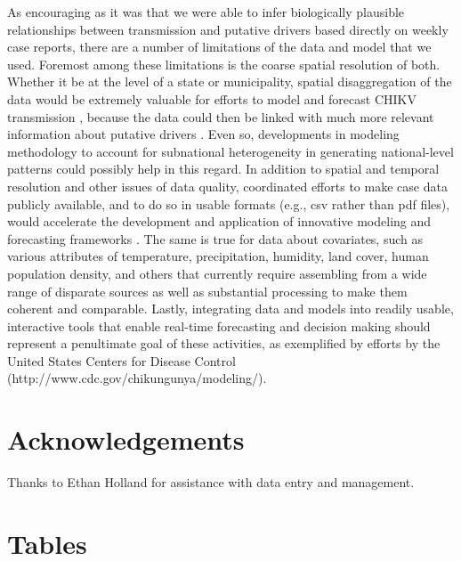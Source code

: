 \documentclass[11pt]{article}
\begin{document}
As encouraging as it was that we were able to infer biologically plausible relationships between transmission and putative drivers based directly on weekly case reports, there are a number of limitations of the data and model that we used. Foremost among these limitations is the coarse spatial resolution of both. Whether it be at the level of a state or municipality, spatial disaggregation of the data would be extremely valuable for efforts to model and forecast CHIKV transmission \cite{Perkins2013,Mills2014}, because the data could then be linked with much more relevant information about putative drivers \cite{Johansson2009}. Even so, developments in modeling methodology to account for subnational heterogeneity in generating national-level patterns could possibly help in this regard. In addition to spatial and temporal resolution and other issues of data quality, coordinated efforts to make case data publicly available, and to do so in usable formats (e.g., csv rather than pdf files), would accelerate the development and application of innovative modeling and forecasting frameworks \cite{Panhuis2013}. The same is true for data about covariates, such as various attributes of temperature, precipitation, humidity, land cover, human population density, and others that currently require assembling from a wide range of disparate sources as well as substantial processing to make them coherent and comparable. Lastly, integrating data and models into readily usable, interactive tools that enable real-time forecasting and decision making should represent a penultimate goal of these activities, as exemplified by efforts by the United States Centers for Disease Control (http://www.cdc.gov/chikungunya/modeling/).


\section*{Acknowledgements}
Thanks to Ethan Holland for assistance with data entry and management.





\newpage
 \section*{Tables}
 
\end{document}
